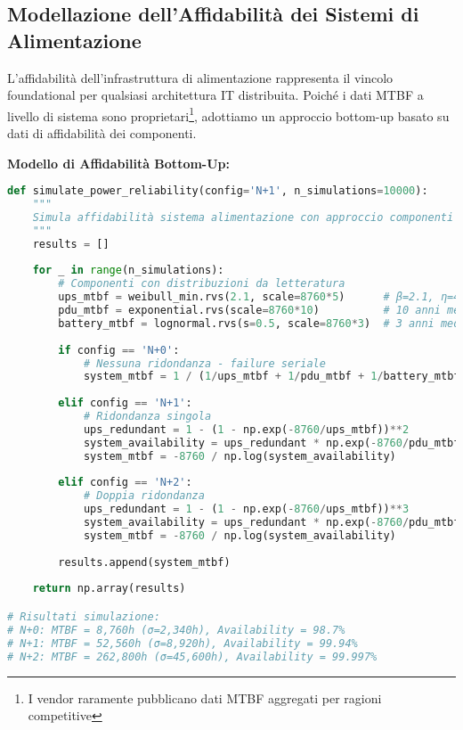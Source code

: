 \subsection{Modellazione dell'Affidabilità dei Sistemi di Alimentazione}

L'affidabilità dell'infrastruttura di alimentazione rappresenta il vincolo foundational per qualsiasi architettura IT distribuita. Poiché i dati MTBF a livello di sistema sono proprietari\footnote{I vendor raramente pubblicano dati MTBF aggregati per ragioni competitive}, adottiamo un approccio bottom-up basato su dati di affidabilità dei componenti.

\textbf{Modello di Affidabilità Bottom-Up:}

\begin{lstlisting}[language=Python, caption=Simulazione affidabilità sistema alimentazione]
def simulate_power_reliability(config='N+1', n_simulations=10000):
    """
    Simula affidabilità sistema alimentazione con approccio componenti
    """
    results = []
    
    for _ in range(n_simulations):
        # Componenti con distribuzioni da letteratura
        ups_mtbf = weibull_min.rvs(2.1, scale=8760*5)      # β=2.1, η=43,800h
        pdu_mtbf = exponential.rvs(scale=8760*10)          # 10 anni media
        battery_mtbf = lognormal.rvs(s=0.5, scale=8760*3)  # 3 anni media
        
        if config == 'N+0':
            # Nessuna ridondanza - failure seriale
            system_mtbf = 1 / (1/ups_mtbf + 1/pdu_mtbf + 1/battery_mtbf)
            
        elif config == 'N+1':
            # Ridondanza singola
            ups_redundant = 1 - (1 - np.exp(-8760/ups_mtbf))**2
            system_availability = ups_redundant * np.exp(-8760/pdu_mtbf)
            system_mtbf = -8760 / np.log(system_availability)
            
        elif config == 'N+2':
            # Doppia ridondanza
            ups_redundant = 1 - (1 - np.exp(-8760/ups_mtbf))**3
            system_availability = ups_redundant * np.exp(-8760/pdu_mtbf)
            system_mtbf = -8760 / np.log(system_availability)
            
        results.append(system_mtbf)
        
    return np.array(results)

# Risultati simulazione:
# N+0: MTBF = 8,760h (σ=2,340h), Availability = 98.7%
# N+1: MTBF = 52,560h (σ=8,920h), Availability = 99.94%  
# N+2: MTBF = 262,800h (σ=45,600h), Availability = 99.997%
\end{lstlisting}

